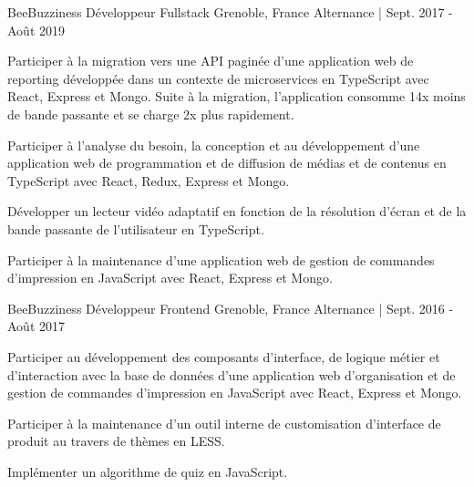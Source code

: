 \begin{cventries}
  \cventry
  	{BeeBuzziness} %
    {Développeur Fullstack} %
    {Grenoble, France} %
    {Alternance | Sept. 2017 - Août 2019} %
    {
      \begin{cvitems} %
        \item {Participer à la migration vers une API paginée d'une application web de reporting développée dans un contexte de microservices en TypeScript avec React, Express et Mongo.
        Suite à la migration, l'application consomme 14x moins de bande passante et se charge 2x plus rapidement.}
        \item {Participer à l’analyse du besoin, la conception et au développement d’une application web de programmation et de diffusion de médias et de contenus en TypeScript avec React, Redux, Express et Mongo.}
        \item {Développer un lecteur vidéo adaptatif en fonction de la résolution d'écran et de la bande passante de l'utilisateur en TypeScript.}
        \item {Participer à la maintenance d’une application web de gestion de commandes d'impression en JavaScript avec React, Express et Mongo.}
      \end{cvitems}
    }

  \cventry
  	{BeeBuzziness} %
    {Développeur Frontend} %
    {Grenoble, France} %
    {Alternance | Sept. 2016 - Août 2017} %
    {
      \begin{cvitems} %
        \item {Participer au développement des composants d’interface, de logique métier et d’interaction avec la base de données d'une application web d'organisation et de gestion de commandes d'impression en JavaScript avec React, Express et Mongo.}
        \item {Participer à la maintenance d’un outil interne de customisation d’interface de produit au travers de thèmes en LESS.}
        \item {Implémenter un algorithme de quiz en JavaScript.}
      \end{cvitems}
    }

\end{cventries}
